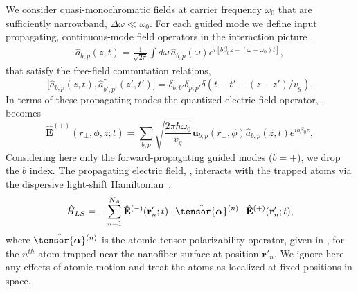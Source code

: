\documentclass[aps,pra,twocolumn]{revtex4-1} %
\newcommand{\poltens}{\hat{\tensor{\boldsymbol{\alpha}}}}
\begin{document}
We consider quasi-monochromatic fields at carrier frequency $\omega_0$ that are sufficiently narrowband, $\Delta \omega \ll \omega_0$. 
For each guided mode we define input propagating, continuous-mode field operators in the interaction picture \cite{gardiner_input_1985, blow_continuum_1990, le_kien_correlations_2008},
	\begin{align}
		\hat{a}_{b,p}(z,t) =\frac{1}{\sqrt{2 \pi}}  \int d \omega \, \hat{a}_{b,p}(\omega) e^{i[b \beta_0 z- (\omega-\omega_0) t ]}, 
	\end{align}
that satisfy the free-field commutation relations,
	\begin{equation} \label{Eq::InputOutputCommutation}
		\big[\hat{a}_{b,p}(z,t),\hat{a}^\dag_{b'\!,p'}(z'\!,t')\big]=\delta_{b,b'}\delta_{p,p'}  \delta(t\!-\!t'\!\!-\!(\!z\!-\!z')/v_g).
	\end{equation}
In terms of these propagating modes the quantized electric field operator, , becomes
	\begin{equation} \label{Eq::PropagatingElectricField}
		\!\!\!\hat{\mathbf{E}}^{(+)}(\!r\!_\perp\!,\phi,z;t\!) \!=\!\! \sum_{b,p}\!\! \sqrt{ \frac{2 \pi \hbar \omega_0}{ v_g} } \mathbf{u}_{b,p}(r\!_\perp\!,\phi) \hat{a}_{b,p}(\!z\!,t\!)  e^{i b \beta\!_0 z}\!,
	\end{equation}	
Considering here only the forward-propagating guided modes ($b=+$), we drop the $b$ index.  
The propagating electric field, , interacts with the trapped atoms via the dispersive light-shift Hamiltonian~\cite{deutsch_quantum_2010,kien_dynamical_2013,baragiola_open_2014},
	\begin{equation} \label{Eq::LightShiftHam}
		\hat{H}_{LS} = - \sum_{n=1}^{N_A} \hat{\mathbf{E}}^{(-)}(\mathbf{r}'_n ; t ) \cdot \poltens {}^{(n)} \cdot \hat{\mathbf{E}}^{(+)}(\mathbf{r}'_n ;t ),
	\end{equation}
where $\poltens {}^{(n)}$ is the atomic tensor polarizability operator, given in , for the $n^{th}$ atom trapped near the nanofiber surface at position $\mathbf{r}'_n$.  We ignore here any effects of atomic motion and treat the atoms as localized at fixed positions in space.
\end{document}
